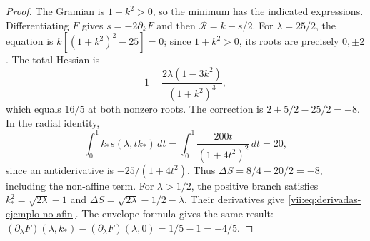 \begin{proof}
The Gramian is \(1+k^2>0\), so the minimum has the indicated
expressions. Differentiating \(F\) gives
\(s=-2\partial_kF\) and then \(\mathcal R=k-s/2\).
For \(\lambda=25/2\), the equation is
\(k[(1+k^2)^2-25]=0\); since \(1+k^2>0\), its roots
are precisely \(0,\pm2\). The total Hessian is
\[
 1-\frac{2\lambda(1-3k^2)}{(1+k^2)^3},
\]
which equals \(16/5\) at both nonzero roots. The correction is
\(2+5/2-25/2=-8\). In the radial identity,
\[
 \int_0^1 k_*s(\lambda,tk_*)\,dt
    =\int_0^1\frac{200t}{(1+4t^2)^2}\,dt=20,
\]
since an antiderivative is \(-25/(1+4t^2)\).
Thus \(\Delta S=8/4-20/2=-8\), including the non-affine term.
For \(\lambda>1/2\), the positive branch satisfies
\(k_*^2=\sqrt{2\lambda}-1\) and
\(\Delta S=\sqrt{2\lambda}-1/2-\lambda\).
Their derivatives give \eqref{vii:eq:derivadas-ejemplo-no-afin}.
The envelope formula gives the same result:
\((\partial_\lambda F)(\lambda,k_*)
 -(\partial_\lambda F)(\lambda,0)=1/5-1=-4/5\).
\end{proof}
